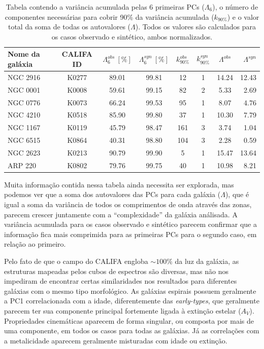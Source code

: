 \begin{table}
	\caption[Variância acumulada para as galáxias análisadas.]
	{Tabela contendo a variância acumulada pelas 6 primeiras PCs ($\Lambda_6$), o número de componentes necessárias para
	cobrir 90\% da variância acumulada ($k_{90\%}$) e o valor total da soma de todas os autovalores ($\Lambda$). Todos os
	valores são calculados para os casos observado e sintético, ambos normalizados.}
	\begin{tabular}{l c c c c c c r}
		Nome da galáxia & CALIFA ID & $\Lambda_6^{obs}\ [\%]$ & $\Lambda_6^{syn}\ [\%]$ & $k_{90\%}^{obs}$ & $k_{90\%}^{syn}$
		& $\Lambda^{obs}$ & $\Lambda^{syn}$ \\ 
		\midrule
		NGC 2916 & K0277 & 89.01 & 99.81 &  12 & 1 & 14.24 & 12.43 \\
		NGC 0001 & K0008 & 59.61 & 99.15 &  82 & 2 &  5.33 &  2.69 \\
		NGC 0776 & K0073 & 66.24 & 99.53 &  95 & 1 &  8.07 &  4.76 \\
		NGC 4210 & K0518 & 85.90 & 99.80 &  37 & 1 & 10.30 &  7.79 \\
		NGC 1167 & K0119 & 45.79 & 98.47 & 161 & 3 &  3.74 &  1.04 \\
		NGC 6515 & K0864 & 40.31 & 98.80 & 104 & 3 &  2.28 &  0.59 \\
		NGC 2623 & K0213 & 90.79 & 99.90 &   5 & 1 & 15.47 & 13.64 \\
		ARP 220  & K0802 & 79.76 & 99.75 &  40 & 1 & 10.98 &  8.21 \\
	\end{tabular}
	\label{tab:resultLambda}
\end{table}

Muita informação contida nessa tabela ainda necessita ser explorada, mas podemos ver que a soma dos autovalores das PCs
para cada galáxia ($\Lambda$), que é igual a soma da variância de todos os comprimentos de onda através das zonas,
parecem crescer juntamente com a ``complexidade'' da galáxia análisada. A variância acumulada para os casos observado e
sintético parecem confirmar que a informação fica mais comprimida para as primeiras PCs para o segundo caso, em relação
ao primeiro. 

Pelo fato de que o campo do CALIFA engloba $\sim100\%$ da luz da galáxia, as estruturas mapeadas pelos cubos de
espectros são diversas, mas não nos impediram de encontrar certas similaridades nos resultados para diferentes galáxias
com o mesmo tipo morfológico. As galáxias espirais possuem geralmente a PC1 correlacionada com a idade, diferentemente
das {\em early-types}, que geralmente parecem ter sua componente principal fortemente ligada à extinção estelar ($A_V$).
Propriedades cinemáticas aparecem de forma singular, ou composta por mais de uma componente, em todos os casos para
todas as galáxias. Já as correlações com a metalicidade aparecem geralmente misturadas com idade ou extinção.

